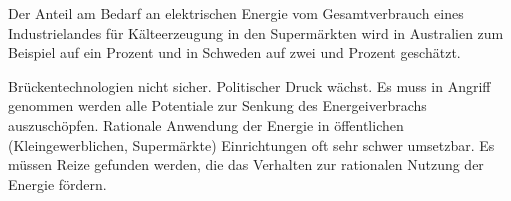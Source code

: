 Der Anteil am Bedarf an elektrischen Energie vom Gesamtverbrauch eines Industrielandes für Kälteerzeugung in den Supermärkten
wird in Australien zum Beispiel auf ein Prozent \cite[Seite 8]{australia} und in Schweden auf zwei \cite[Seite
6]{doctor} und \cite{EANRW} Prozent geschätzt.

Brückentechnologien nicht sicher. Politischer Druck wächst. Es muss in Angriff genommen werden alle Potentiale zur Senkung
des Energeiverbrachs auszuschöpfen.  Rationale Anwendung der Energie in öffentlichen (Kleingewerblichen, Supermärkte)
Einrichtungen oft sehr schwer umsetzbar. Es müssen Reize gefunden werden, die das Verhalten zur rationalen Nutzung der
Energie fördern.

